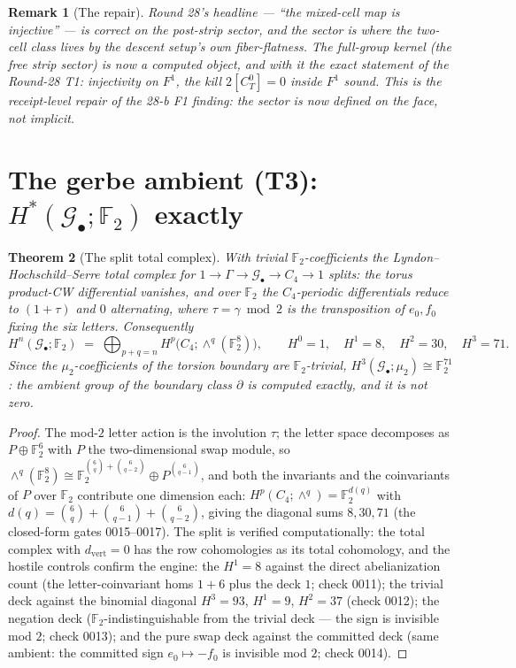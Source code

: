 \documentclass[11pt]{article}
\newtheorem{theorem}{Theorem}
\newtheorem{remark}[theorem]{Remark}
\newcommand{\GammaL}{\Gamma}
\newcommand{\Cfour}{C_4}
\newcommand{\Gbul}{\mathcal{G}_\bullet}
\newcommand{\F}{\mathbb{F}}
\newcommand{\mud}{\mu_2}
\begin{document}
\begin{remark}[The repair]
Round 28's headline --- ``the mixed-cell map is injective'' --- is
correct \emph{on the post-strip sector}, and the sector is where the
two-cell class lives by the descent setup's own fiber-flatness. The
full-group kernel (the free strip sector) is now a computed object,
and with it the exact statement of the Round-28 T1: injectivity on
$F^1$, the kill $2[C_T^0]=0$ inside $F^1$ sound. This is the
receipt-level repair of the 28-b F1 finding: the sector is now
\emph{defined} on the face, not implicit.
\end{remark}

\section{The gerbe ambient (T3): $H^*(\Gbul;\F_2)$ exactly}

\begin{theorem}[The split total complex]\label{th:ambient}
With trivial $\F_2$-coefficients the Lyndon--Hochschild--Serre total
complex for $1\to\GammaL\to\Gbul\to\Cfour\to 1$ splits: the torus
product-CW differential vanishes, and over $\F_2$ the $\Cfour$-periodic
differentials reduce to $(1+\tau)$ and $0$ alternating, where
$\tau=\gamma\bmod 2$ is the transposition of $e_0,f_0$ fixing the six
letters. Consequently
\[
H^n(\Gbul;\F_2)\;=\;\bigoplus_{p+q=n}H^p\bigl(\Cfour;\wedge^q(\F_2^8)\bigr),
\qquad
H^0=1,\quad H^1=8,\quad H^2=30,\quad H^3=71.
\]
Since the $\mud$-coefficients of the torsion boundary are
$\F_2$-trivial, $H^3(\Gbul;\mud)\cong\F_2^{71}$: \emph{the ambient group
of the boundary class $\partial$ is computed exactly, and it is not
zero.}
\end{theorem}

\begin{proof}
The mod-$2$ letter action is the involution $\tau$; the letter space
decomposes as $P\oplus\F_2^6$ with $P$ the two-dimensional swap
module, so $\wedge^q(\F_2^8)\cong\F_2^{\binom6q+\binom6{q-2}}\oplus
P^{\binom6{q-1}}$, and both the invariants and the coinvariants of $P$
over $\F_2$ contribute one dimension each:
$H^p(\Cfour;\wedge^q)=\F_2^{d(q)}$ with
$d(q)=\binom6q+\binom6{q-1}+\binom6{q-2}$, giving the diagonal sums
$8,30,71$ (the closed-form gates 0015--0017). The split is verified
computationally: the total complex with
$d_{\mathrm{vert}}=0$ has the row cohomologies as its total cohomology,
and the hostile controls confirm the engine: the $H^1=8$ against the
direct abelianization count (the letter-coinvariant homs $1+6$ plus
the deck $1$; check 0011); the trivial deck against the binomial
diagonal $H^3=93$, $H^1=9$, $H^2=37$ (check 0012); the negation deck
($\F_2$-indistinguishable from the trivial deck --- the sign is
invisible mod $2$; check 0013); and the pure swap deck against the
committed deck (same ambient: the committed sign $e_0\mapsto -f_0$ is
invisible mod $2$; check 0014).
\end{proof}
\end{document}
